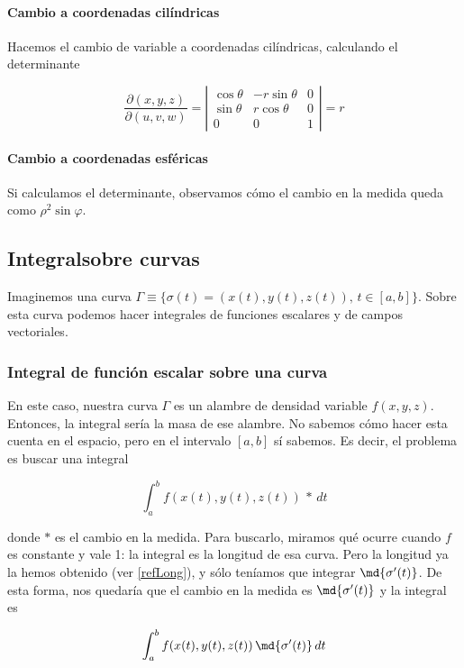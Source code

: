 \documentclass[nochap]{apuntes}
\begin{document}
\paragraph{Cambio a coordenadas cilíndricas}

Hacemos el cambio de variable a coordenadas cilíndricas, calculando el determinante

\[ \frac{∂(x,y,z)}{∂(u,v,w)} = \left|\begin{matrix}
\cos\theta & -r\sin\theta & 0\\
\sin\theta & r\cos\theta & 0 \\
0& 0 & 1
\end{matrix}\right| = r \]

\paragraph{Cambio a coordenadas esféricas}

Si calculamos el determinante, observamos cómo el cambio en la medida queda como $\rho^2\sin\varphi$.

\subsection{Integral\IS sobre curvas}
Imaginemos una curva $\Gamma \equiv \{ \sigma(t) = (x(t), y(t), z(t)),\, t\in [a,b]\}$. Sobre esta curva podemos hacer integrales de funciones escalares y de campos vectoriales.

\subsubsection{Integral de función escalar sobre una curva}

En este caso, nuestra curva $\Gamma$ es un alambre de densidad variable $f(x,y,z)$. Entonces, la integral sería la masa de ese alambre. No sabemos cómo hacer esta cuenta en el espacio, pero en el intervalo $[a,b]$ sí sabemos. Es decir, el problema es buscar una integral

\[ \int_a^b f(x(t), y(t), z(t))\,\ast\,dt \]

donde $\ast$ es el cambio en la medida. Para buscarlo, miramos qué ocurre cuando $f$ es constante y vale 1: la integral es la longitud de esa curva. Pero la longitud ya la hemos obtenido (ver \ref{refLong}), y sólo teníamos que integrar $\md{\sigma'(t)}$. De esta forma, nos quedaría que el cambio en la medida es $\md{\sigma'(t)}$ y la integral es 

\[ \int_a^b f(x(t), y(t), z(t))\,\md{\sigma'(t)}\,dt \]
\end{document}

